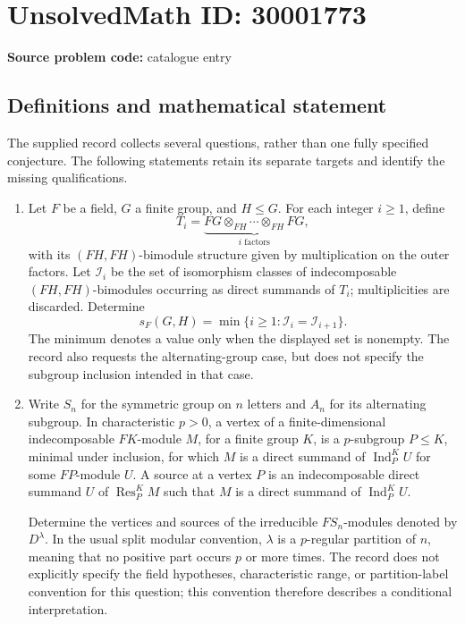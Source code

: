 \documentclass[11pt]{article}
\begin{document}
\section*{UnsolvedMath ID: 30001773}
\textbf{Source problem code:} catalogue entry
\subsection{Definitions and mathematical statement}
The supplied record collects several questions, rather than one fully specified conjecture. The following statements retain its separate targets and identify the missing qualifications.

\begin{enumerate}
\item Let \(F\) be a field, \(G\) a finite group, and \(H\leq G\). For each integer \(i\geq 1\), define
\[
T_i=\underbrace{FG\otimes_{FH}\cdots\otimes_{FH}FG}_{i\text{ factors}},
\]
with its \((FH,FH)\)-bimodule structure given by multiplication on the outer factors. Let \(\mathcal I_i\) be the set of isomorphism classes of indecomposable \((FH,FH)\)-bimodules occurring as direct summands of \(T_i\); multiplicities are discarded. Determine
\[
s_F(G,H)=\min\{i\geq 1:\mathcal I_i=\mathcal I_{i+1}\}.
\]
The minimum denotes a value only when the displayed set is nonempty. The record also requests the alternating-group case, but does not specify the subgroup inclusion intended in that case.

\item Write \(S_n\) for the symmetric group on \(n\) letters and \(A_n\) for its alternating subgroup. In characteristic \(p>0\), a vertex of a finite-dimensional indecomposable \(FK\)-module \(M\), for a finite group \(K\), is a \(p\)-subgroup \(P\leq K\), minimal under inclusion, for which \(M\) is a direct summand of \(\operatorname{Ind}_P^K U\) for some \(FP\)-module \(U\). A source at a vertex \(P\) is an indecomposable direct summand \(U\) of \(\operatorname{Res}_P^K M\) such that \(M\) is a direct summand of \(\operatorname{Ind}_P^K U\).

Determine the vertices and sources of the irreducible \(FS_n\)-modules denoted by \(D^\lambda\). In the usual split modular convention, \(\lambda\) is a \(p\)-regular partition of \(n\), meaning that no positive part occurs \(p\) or more times. The record does not explicitly specify the field hypotheses, characteristic range, or partition-label convention for this question; this convention therefore describes a conditional interpretation.


\end{enumerate}
\end{document}
